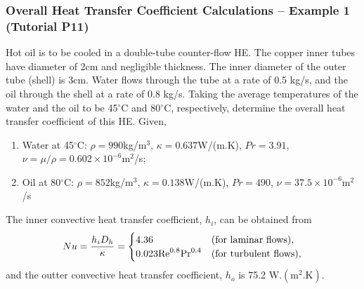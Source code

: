 \documentclass[10pt,compress,unknownkeysallowed]{beamer}
\begin{document}
\begin{frame}
  \frametitle{Overall Heat Transfer Coefficient Calculations -- Example 1 (Tutorial P11)}
Hot oil is to be cooled in a double-tube counter-flow HE. The copper inner tubes have diameter of 2cm and negligible thickness. The inner diameter of the outer tube (shell) is 3cm. Water flows through the tube at a rate of 0.5 kg/s, and the oil through the shell at a rate of 0.8 kg/s. Taking the average temperatures of the water and the oil to be 45$^{\circ}$C and 80$^{\circ}$C, respectively, determine the overall heat transfer coefficient of this HE. Given, 
\begin{enumerate} 
    \item Water at 45$^{\circ}$C: $\rho=990$kg/m$^{3}$, $\kappa=0.637$W/(m.K), $Pr=3.91$, $\nu=\mu/\rho=0.602\times 10^{-6}$m$^{2}$/s; 
    \item Oil at 80$^{\circ}$C: $\rho=852$kg/m$^{3}$, $\kappa=0.138$W/(m.K), $Pr=490$, $\nu=37.5\times 10^{-6}$m$^{2}$/s
\end{enumerate}
The inner convective heat transfer coefficient, $h_{i}$, can be obtained from
\begin{displaymath}
       Nu = \displaystyle\frac{h_{i}D_{h}}{\kappa} =
   \begin{cases}
       4.36  & \text{(for laminar flows),} \\
       0.023\mathrm{Re}^{0.8}\mathrm{Pr}^{0.4} & \text{(for turbulent flows),} \\
   \end{cases}
\end{displaymath}
and the outter convective heat transfer coefficient, $h_{o}$ is 75.2 W.$\left(\text{m}^{2}.\text{K}\right)$.

\end{frame}
\end{document}
